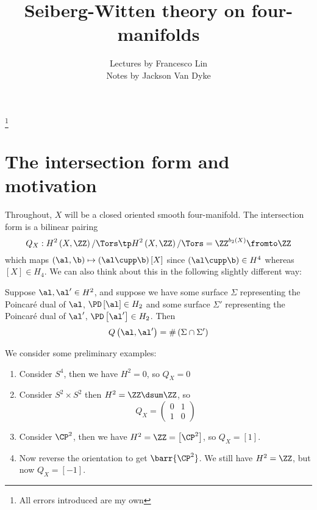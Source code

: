 \documentclass{amsart}
\begin{document}
\title{Seiberg-Witten theory on four-manifolds}
\author{Lectures by Francesco Lin\\
Notes by Jackson Van Dyke}
\thanks{All errors introduced are my own}
\maketitle

\section{The intersection form and motivation}

Throughout, $X$ will be a closed oriented smooth four-manifold. 
The intersection form is a bilinear pairing 
\begin{equation}
Q_X:H^2\left( X , \ZZ \right)/\Tors 
\tp H^2\left( X , \ZZ \right)/\Tors = \ZZ^{b_2\left( X \right)} \fromto\ZZ
\end{equation}
which maps $\left( \al , \b \right) \mapsto \left( \al \cupp \b \right)\left[ X \right]$
since $\left( \al \cupp \b \right) \in H^4$ whereas 
$\left[ X \right]\in H_4$.
We can also think about this in the following slightly different way:

\begin{thm}
Suppose $\al , \al'\in H^2$, and suppose we have some surface $\Sigma$ representing the Poincar\'e
dual of $\al$, $\PD\left[ \al \right] \in H_2$ and some surface $\Sigma'$ representing
the Poincar\'e dual of $\al'$, $\PD\left[ \al' \right] \in H_2$.
Then 
\begin{equation}
Q\left( \al , \al' \right) = \#\left( \Sigma \cap \Sigma' \right)
\end{equation}
\end{thm}

\begin{exm}
We consider some preliminary examples:
\begin{enumerate}
\item Consider $S^4$, then we have $H^2 = 0$, so $Q_X = 0$
\item Consider $S^2 \times S^2$ then $H^2 = \ZZ \dsum \ZZ$, so
\begin{equation}
Q_X = 
\begin{pmatrix}
0 & 1 \\ 1 & 0
\end{pmatrix}
\end{equation}
\item Consider $\CP^2$, then we have $H^2 = \ZZ = \left[ \CP^2 \right]$, so
$Q_X = \left[ 1 \right]$. 
\item Now reverse the orientation to get $\barr{\CP^2}$. We still have
$H^2 = \ZZ$, but now $Q_X = \left[ -1 \right]$.
\end{enumerate}
\end{exm}
\end{document}
